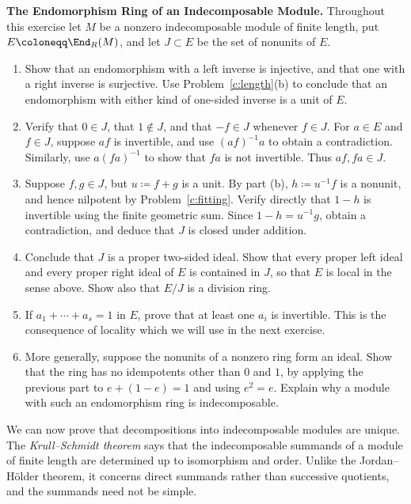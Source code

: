 \documentclass[12pt,reqno]{amsart}
\begin{document}
\begin{problems}
\item\label{c:local-endomorphisms} \textbf{The Endomorphism Ring of an Indecomposable Module.} Throughout this exercise let $M$ be a nonzero indecomposable module of finite length, put $E\coloneqq\End_R(M)$, and let $J\subset E$ be the set of nonunits of $E$.
\begin{enumerate}
\item Show that an endomorphism with a left inverse is injective, and that one with a right inverse is surjective. Use Problem~\ref{c:length}(b) to conclude that an endomorphism with either kind of one-sided inverse is a unit of $E$.
\item Verify that $0\in J$, that $1\notin J$, and that $-f\in J$ whenever $f\in J$. For $a\in E$ and $f\in J$, suppose $af$ is invertible, and use $(af)^{-1}a$ to obtain a contradiction. Similarly, use $a(fa)^{-1}$ to show that $fa$ is not invertible. Thus $af,fa\in J$.
\item Suppose $f,g\in J$, but $u\coloneqq f+g$ is a unit. By part (b), $h\coloneqq u^{-1}f$ is a nonunit, and hence nilpotent by Problem~\ref{c:fitting}. Verify directly that $1-h$ is invertible using the finite geometric sum. Since $1-h=u^{-1}g$, obtain a contradiction, and deduce that $J$ is closed under addition.
\item Conclude that $J$ is a proper two-sided ideal. Show that every proper left ideal and every proper right ideal of $E$ is contained in $J$, so that $E$ is local in the sense above. Show also that $E/J$ is a division ring.
\item If $a_1+\cdots+a_s=1$ in $E$, prove that at least one $a_i$ is invertible. This is the consequence of locality which we will use in the next exercise.
\item More generally, suppose the nonunits of a nonzero ring form an ideal. Show that the ring has no idempotents other than $0$ and $1$, by applying the previous part to $e+(1-e)=1$ and using $e^2=e$. Explain why a module with such an endomorphism ring is indecomposable.
\end{enumerate}
\end{problems}

\hrulefill

We can now prove that decompositions into indecomposable modules are unique. The \emph{Krull--Schmidt theorem} says that the indecomposable summands of a module of finite length are determined up to isomorphism and order. Unlike the Jordan--H\"older theorem, it concerns direct summands rather than successive quotients, and the summands need not be simple.
\end{document}
